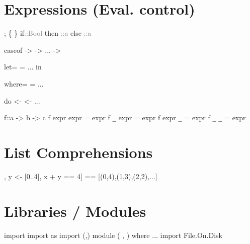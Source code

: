 \documentclass{refcard}
\begin{document}
\section{Expressions (Eval. control)}

\begin{ldesc}
	         ;
	          \{ \}
	\li
	\li[if expression]
		if\s{}\s\textcolor{gray}{::\s{}Bool} \li
		\s\s{}then\s{} \textcolor{gray}{::\s{}a} \li
		\s\s{}else\s{} \textcolor{gray}{::\s{}a} \li

		case\s{}\s{}of     \li
		\s\s{}\s->\s{}   \li
		\s\s{}\s->\s{}   \li
		\s\s... \li
		\s\s{}\I{\_}\s->\s{}   \li

		let\s{}= \li
		\s\s\s\s{}= \li
		\s\s\s\s... \li
		in\s{} \li

		 \li
		where\s{}= \li
		\s\s\s\s\s\s{}= \li
		\s\s\s\s\s\s... \li

	\li[do notation]
		do       \li
		\s\s\s{} <-  \li
		\s\s\s{} \li
		\s\s\s{} <-  \li
		\s\s\s{}... \li

		f\s::\s{}a -> b -> c 
		f expr expr = expr \li
		f \verb+_+\s\s\s{} expr = expr \li
		f expr \verb+_+\s\s\s{} = expr \li
		f \verb+_+\s\s\s{} \verb+_+\s\s\s{} = expr
\end{ldesc}


\section{List Comprehensions}

\begin{ldesc}
	\li[pairs where sum=4] [(x,y) | \li
	                       \s\s{}x <- [0..4], \li
						   \s\s{}y <- [0..4], \li
						   \s\s{}x + y == 4] \li
	                       == [(0,4),(1,3),(2,2),...]
\end{ldesc}


\section{Libraries / Modules}

\begin{ldesc}
	\li[importing]              import 
	  import  as 
	     import  (,)
	\li[declaring]
		module  \li
		\s\s(  \li
		\s\s,  \li
		\s\s) \li
		where \li
	    ... \li
	 import File.On.Disk
\end{ldesc}
\end{document}
